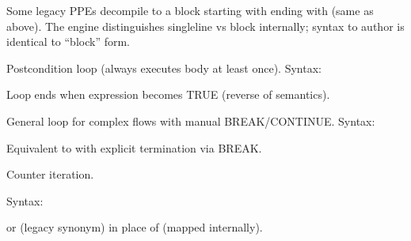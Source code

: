 \documentclass[letterpaper,10pt,english]{sphinxmanual}
\begin{document}
\begin{description}
\sphinxAtStartPar
Some legacy PPEs decompile to a block starting with  ending with  (same as above).
The engine distinguishes single\sphinxhyphen{}line vs block internally; syntax to author is identical to “block” form.

\sphinxAtStartPar
Post\sphinxhyphen{}condition loop (always executes body at least once).
Syntax:

\begin{sphinxVerbatim}[commandchars=\\\{\}]
   
\end{sphinxVerbatim}

\sphinxAtStartPar
Loop ends when expression becomes TRUE (reverse of  semantics).

\sphinxAtStartPar
General loop for complex flows with manual BREAK/CONTINUE.
Syntax:

\begin{sphinxVerbatim}[commandchars=\\\{\}]
\end{sphinxVerbatim}

\sphinxAtStartPar
Equivalent to  with explicit termination via BREAK.

\sphinxAtStartPar
Counter iteration.

\sphinxAtStartPar
Syntax:

\begin{sphinxVerbatim}[commandchars=\\\{\}]
      \PYG{p}{[} \PYG{p}{]}
\end{sphinxVerbatim}

\sphinxAtStartPar
or (legacy synonym)  in place of  (mapped internally).


\end{description}
\end{document}
